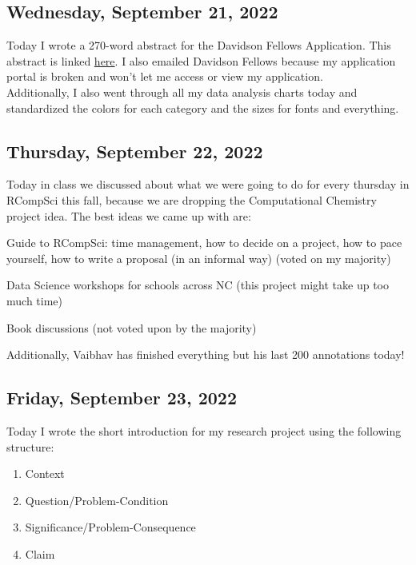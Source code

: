 \documentclass[11pt,letterpaper]{article}
\begin{document}
\subsection{Wednesday, September 21, 2022}
Today I wrote a 270-word abstract for the Davidson Fellows Application. This abstract is linked \href{https://docs.google.com/document/d/1Oml89K4HLl-hOmNRIxNZvUlTRzkaLN7PjgQ6yiHBL-A/edit}{here}. I also emailed Davidson Fellows because my application portal is broken and won't let me access or view my application.
\\

Additionally, I also went through all my data analysis charts today and standardized the colors for each category and the sizes for fonts and everything.

\subsection{Thursday, September 22, 2022}
Today in class we discussed about what we were going to do for every thursday in RCompSci this fall, because we are dropping the Computational Chemistry project idea. The best ideas we came up with are:
\begin{item}
    \item Guide to RCompSci: time management, how to decide on a project, how to pace yourself, how to write a proposal (in an informal way) (voted on my majority)
    \item Data Science workshops for schools across NC (this project might take up too much time)
    \item Book discussions (not voted upon by the majority)
\end{item}

Additionally, Vaibhav has finished everything but his last 200 annotations today!

\subsection{Friday, September 23, 2022}
Today I wrote the short introduction for my research project using the following structure:

\begin{enumerate}
    \item Context
    \item Question/Problem-Condition
    \item Significance/Problem-Consequence
    \item Claim
\end{enumerate}
\end{document}
